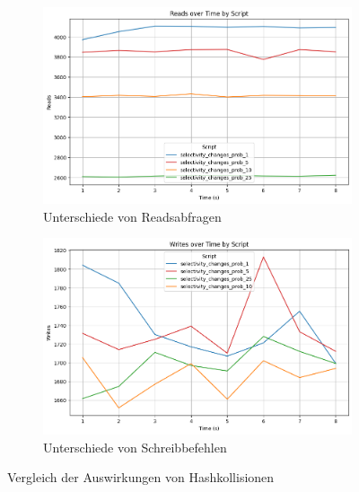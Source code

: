 \begin{figure}[H]
    \centering
    \begin{subfigure}[t]{0.48\textwidth}
        \centering
        \includegraphics[width=\textwidth]{PNGs/Script/Index/Hash/selectivity-change/Reads}
        \caption{Unterschiede von Readsabfragen}
        \label{hash-collision-reads}
    \end{subfigure}
    \hfill
    \begin{subfigure}[t]{0.48\textwidth}
        \centering
        \includegraphics[width=\textwidth]{PNGs/Script/Index/Hash/selectivity-change/Writes}
        \caption{Unterschiede von Schreibbefehlen}
        \label{hash-collision-writes}
    \end{subfigure}
    \caption[Hash-Indexing: Auswirkungen von Hashkollisionen]{Vergleich der Auswirkungen von Hashkollisionen}
    \label{fig:hash-collision-comparison}
\end{figure}
\vspace{-15pt}

